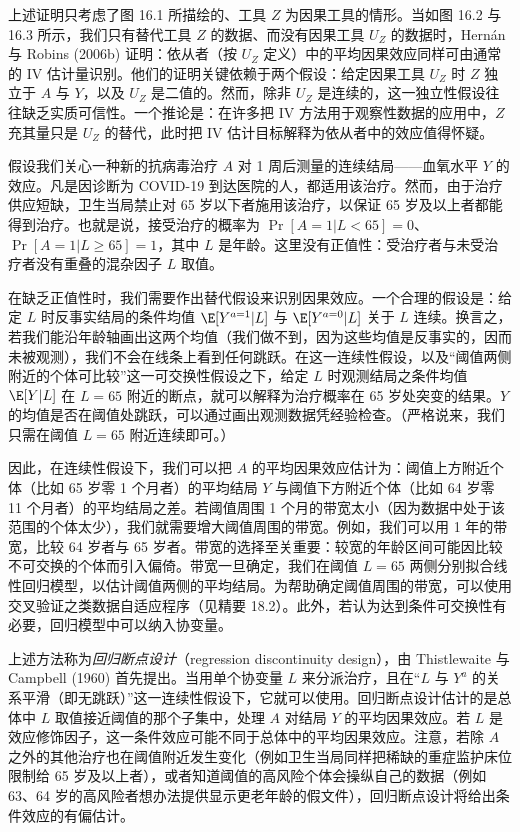 \begin{techpoint}[单调性与依从者中的效应]
上述证明只考虑了图 16.1 所描绘的、工具 $Z$ 为因果工具的情形。当如图 16.2 与 16.3 所示，我们只有替代工具 $Z$ 的数据、而没有因果工具 $U_Z$ 的数据时，Hernán 与 Robins (2006b) 证明：依从者（按 $U_Z$ 定义）中的平均因果效应同样可由通常的 IV 估计量识别。他们的证明关键依赖于两个假设：给定因果工具 $U_Z$ 时 $Z$ 独立于 $A$ 与 $Y$，以及 $U_Z$ 是二值的。然而，除非 $U_Z$ 是连续的，这一独立性假设往往缺乏实质可信性。一个推论是：在许多把 IV 方法用于观察性数据的应用中，$Z$ 充其量只是 $U_Z$ 的替代，此时把 IV 估计目标解释为依从者中的效应值得怀疑。
\end{techpoint}

\begin{finepoint}[回归断点设计]
假设我们关心一种新的抗病毒治疗 $A$ 对 1 周后测量的连续结局——血氧水平 $Y$ 的效应。凡是因诊断为 COVID-19 到达医院的人，都适用该治疗。然而，由于治疗供应短缺，卫生当局禁止对 65 岁以下者施用该治疗，以保证 65 岁及以上者都能得到治疗。也就是说，接受治疗的概率为 $\Pr[A=1|L<65]=0$、$\Pr[A=1|L\ge 65]=1$，其中 $L$ 是年龄。这里没有正值性：受治疗者与未受治疗者没有重叠的混杂因子 $L$ 取值。

在缺乏正值性时，我们需要作出替代假设来识别因果效应。一个合理的假设是：给定 $L$ 时反事实结局的条件均值 $\E[Y^{a=1}|L]$ 与 $\E[Y^{a=0}|L]$ 关于 $L$ 连续。换言之，若我们能沿年龄轴画出这两个均值（我们做不到，因为这些均值是反事实的，因而未被观测），我们不会在线条上看到任何跳跃。在这一连续性假设，以及“阈值两侧附近的个体可比较”这一可交换性假设之下，给定 $L$ 时观测结局之条件均值 $\E[Y|L]$ 在 $L=65$ 附近的断点，就可以解释为治疗概率在 65 岁处突变的结果。$Y$ 的均值是否在阈值处跳跃，可以通过画出观测数据凭经验检查。（严格说来，我们只需在阈值 $L=65$ 附近连续即可。）

因此，在连续性假设下，我们可以把 $A$ 的平均因果效应估计为：阈值上方附近个体（比如 65 岁零 1 个月者）的平均结局 $Y$ 与阈值下方附近个体（比如 64 岁零 11 个月者）的平均结局之差。若阈值周围 1 个月的带宽太小（因为数据中处于该范围的个体太少），我们就需要增大阈值周围的带宽。例如，我们可以用 1 年的带宽，比较 64 岁者与 65 岁者。带宽的选择至关重要：较宽的年龄区间可能因比较不可交换的个体而引入偏倚。带宽一旦确定，我们在阈值 $L=65$ 两侧分别拟合线性回归模型，以估计阈值两侧的平均结局。为帮助确定阈值周围的带宽，可以使用交叉验证之类数据自适应程序（见精要 18.2）。此外，若认为达到条件可交换性有必要，回归模型中可以纳入协变量。

上述方法称为\emph{回归断点设计}（regression discontinuity design），由 Thistlewaite 与 Campbell (1960) 首先提出。当用单个协变量 $L$ 来分派治疗，且在“$L$ 与 $Y^{a}$ 的关系平滑（即无跳跃）”这一连续性假设下，它就可以使用。回归断点设计估计的是总体中 $L$ 取值接近阈值的那个子集中，处理 $A$ 对结局 $Y$ 的平均因果效应。若 $L$ 是效应修饰因子，这一条件效应可能不同于总体中的平均因果效应。注意，若除 $A$ 之外的其他治疗也在阈值附近发生变化（例如卫生当局同样把稀缺的重症监护床位限制给 65 岁及以上者），或者知道阈值的高风险个体会操纵自己的数据（例如 63、64 岁的高风险者想办法提供显示更老年龄的假文件），回归断点设计将给出条件效应的有偏估计。


\end{finepoint}
